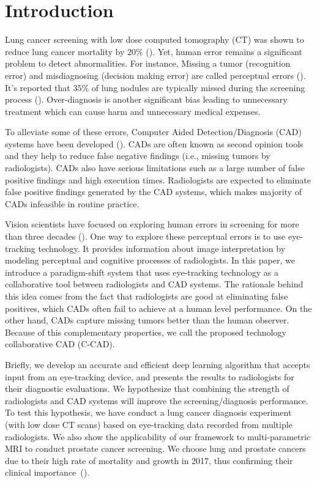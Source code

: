 \documentclass[preprint,12pt]{elsarticle}
\begin{document}
\section{Introduction}
Lung cancer screening with low dose computed tomography (CT) was shown to reduce lung cancer mortality by $20\%$ (\cite{CAAC:CAAC21387}). Yet, human error remains a significant problem to detect abnormalities. For instance, Missing a tumor (recognition error) and misdiagnosing (decision making error) are called perceptual errors (\cite{kundel1978visual}). It's reported that $35\%$ of lung nodules are typically missed during the screening process (\cite{caroline2014lung}). Over-diagnosis is another significant bias leading to unnecessary treatment which can cause harm and unnecessary medical expenses.


To alleviate some of these errors, Computer Aided Detection/Diagnosis (CAD) systems have been developed (\cite{firmino2014computer,lemaitre2015computer,jalalian2013computer}). CADs are often known as second opinion tools and they help to reduce false negative findings (i.e., missing tumors by radiologists). CADs also have serious limitations such as a large number of false positive findings and high execution times. Radiologists are expected to eliminate false positive findings generated by the CAD systems, which makes majority of CADs infeasible in routine practice.




Vision scientists have focused on exploring human errors in screening for more than three decades (\cite{kundel1978visual,lee2013cognitive,mccreadie2009eight,al2017eye,kok2017before,venjakob2015visual,drew2013informatics,manning2006radiologists,littlefair2017does,tourassi2013investigating}). One way to explore these perceptual errors is to use eye-tracking technology. It provides information about image interpretation by modeling perceptual and cognitive processes of radiologists. In this paper, we introduce a paradigm-shift system that uses eye-tracking technology as a collaborative tool between radiologists and CAD systems. The rationale behind this idea comes from the fact that radiologists are good at eliminating false positives, which CADs often fail to achieve at a human level performance. On the other hand, CADs capture missing tumors better than the human observer. Because of this complementary properties, we call the proposed technology collaborative CAD (C-CAD).


Briefly, we develop an accurate and efficient deep learning algorithm that accepts input from an eye-tracking device, and presents the results to radiologists for their diagnostic evaluations. We hypothesize that combining the strength of radiologists and CAD systems will improve the screening/diagnosis performance. To test this hypothesis, we have conduct a lung cancer diagnosis experiment (with low dose CT scans) based on eye-tracking data recorded from multiple radiologists. We also show the applicability of our framework to multi-parametric MRI to conduct prostate cancer screening. We choose lung and prostate cancers due to their high rate of mortality and growth in 2017, thus confirming their clinical importance~(\cite{CAAC:CAAC21387}).
\end{document}
